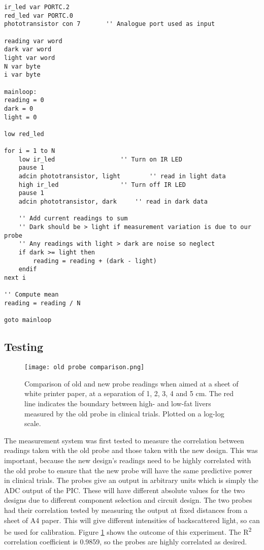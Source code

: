 \begin{lstlisting}
ir_led var PORTC.2
red_led var PORTC.0
phototransistor con 7       '' Analogue port used as input

reading var word
dark var word
light var word
N var byte
i var byte

mainloop:
reading = 0
dark = 0
light = 0

low red_led

for i = 1 to N
    low ir_led					'' Turn on IR LED
    pause 1
    adcin phototransistor, light		'' read in light data
    high ir_led					'' Turn off IR LED
    pause 1
    adcin phototransistor, dark		'' read in dark data
    
    '' Add current readings to sum
    '' Dark should be > light if measurement variation is due to our probe
    '' Any readings with light > dark are noise so neglect
    if dark >= light then
        reading = reading + (dark - light)
    endif
next i  

'' Compute mean
reading = reading / N

goto mainloop
\end{lstlisting}






\subsection{Testing}
\begin{figure}[htb]
	\centering
	\texttt{[image: old probe comparison.png]}
	\caption{Comparison of old and new probe readings when aimed at a sheet of white printer paper, at a separation of 1, 2, 3, 4 and 5 cm. The red line indicates the boundary between high- and low-fat livers measured by the old probe in clinical trials. Plotted on a log-log scale.}
	\label{fig: old probe comparison}
\end{figure}

The measurement system was first tested to measure the correlation between readings taken with the old probe and those taken with the new design. This was important, because the new design's readings need to be highly correlated with the old probe to ensure that the new probe will have the same predictive power in clinical trials. The probes give an output in arbitrary units which is simply the ADC output of the PIC. These will have different absolute values for the two designs due to different component selection and circuit design. The two probes had their correlation tested by measuring the output at fixed distances from a sheet of A4 paper. This will give different intensities of backscattered light, so can be used for calibration. Figure \ref{fig: old probe comparison} shows the outcome of this experiment. The R\textsuperscript{2} correlation coefficient is 0.9859, so the probes are highly correlated as desired. \\

